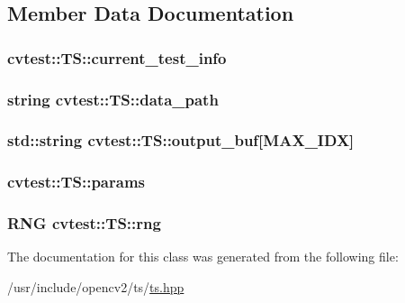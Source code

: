 \subsection{Member Data Documentation}
\hypertarget{classcvtest_1_1TS_a5a64dcb103bce8b6efdece7901900e11}{
\subsubsection[{current\-\_\-test\-\_\-info}]{ cvtest\-::\-T\-S\-::current\-\_\-test\-\_\-info\hspace{0.3cm}{\ttfamily [protected]}}}\label{classcvtest_1_1TS_a5a64dcb103bce8b6efdece7901900e11}
\hypertarget{classcvtest_1_1TS_a819fea5ad66ed952dab11fbba9bfb49d}{
\subsubsection[{data\-\_\-path}]{\setlength{\rightskip}{0pt plus 5cm}string cvtest\-::\-T\-S\-::data\-\_\-path\hspace{0.3cm}{\ttfamily [protected]}}}\label{classcvtest_1_1TS_a819fea5ad66ed952dab11fbba9bfb49d}
\hypertarget{classcvtest_1_1TS_a1f1690ef50b8b5f6cf1c661805e6f377}{
\subsubsection[{output\-\_\-buf}]{\setlength{\rightskip}{0pt plus 5cm}std\-::string cvtest\-::\-T\-S\-::output\-\_\-buf\mbox{[}{\bf M\-A\-X\-\_\-\-I\-D\-X}\mbox{]}\hspace{0.3cm}{\ttfamily [protected]}}}\label{classcvtest_1_1TS_a1f1690ef50b8b5f6cf1c661805e6f377}
\hypertarget{classcvtest_1_1TS_a4629947fcef74e97555f2ca01480b9ef}{
\subsubsection[{params}]{ cvtest\-::\-T\-S\-::params\hspace{0.3cm}{\ttfamily [protected]}}}\label{classcvtest_1_1TS_a4629947fcef74e97555f2ca01480b9ef}
\hypertarget{classcvtest_1_1TS_aeef5453eb56944916a092c0dd225ab5e}{
\subsubsection[{rng}]{\setlength{\rightskip}{0pt plus 5cm}R\-N\-G cvtest\-::\-T\-S\-::rng\hspace{0.3cm}{\ttfamily [protected]}}}\label{classcvtest_1_1TS_aeef5453eb56944916a092c0dd225ab5e}


The documentation for this class was generated from the following file\-:\begin{DoxyCompactItemize}
\item 
/usr/include/opencv2/ts/\hyperlink{ts_8hpp}{ts.\-hpp}\end{DoxyCompactItemize}

